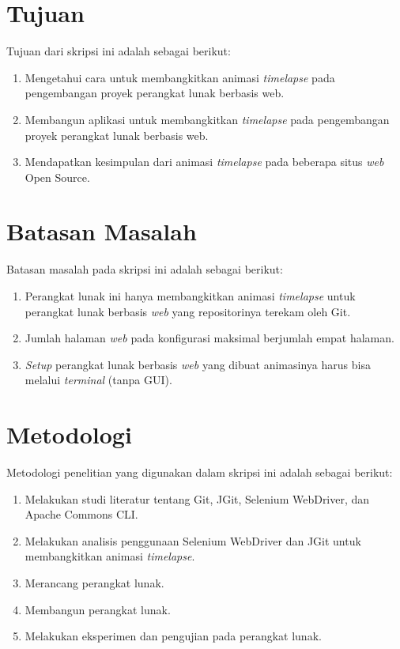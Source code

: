 \section{Tujuan}
\label{sec:tujuan}
Tujuan dari skripsi ini adalah sebagai berikut:
\begin{enumerate}
	\item Mengetahui cara untuk membangkitkan animasi \textit{timelapse} pada pengembangan proyek perangkat lunak berbasis web.
	\item Membangun aplikasi untuk membangkitkan \textit{timelapse} pada pengembangan proyek perangkat lunak berbasis web.
	\item Mendapatkan kesimpulan dari animasi \textit{timelapse} pada beberapa situs \textit{web} Open Source.
\end{enumerate}
	

\section{Batasan Masalah}
\label{sec:batasan}
Batasan masalah pada skripsi ini adalah sebagai berikut:
\begin{enumerate}
		\item Perangkat lunak ini hanya membangkitkan animasi \textit{timelapse} untuk perangkat lunak berbasis \textit{web} yang repositorinya terekam oleh Git. 
	    \item Jumlah halaman \textit{web} pada konfigurasi maksimal berjumlah empat halaman.
	    \item \textit{Setup} perangkat lunak berbasis \textit{web} yang dibuat animasinya harus bisa  melalui \textit{terminal} (tanpa GUI).
\end{enumerate}
\section{Metodologi}
\label{sec:metlit}
Metodologi penelitian yang digunakan dalam skripsi ini adalah sebagai berikut:
\begin{enumerate}
		\item Melakukan studi literatur tentang Git, JGit, Selenium WebDriver, dan Apache Commons CLI.
		\item Melakukan analisis penggunaan Selenium WebDriver dan JGit untuk membangkitkan animasi \textit{timelapse}.
		\item Merancang perangkat lunak.
		\item Membangun perangkat lunak.
		\item Melakukan eksperimen dan pengujian pada perangkat lunak.
	\end{enumerate}

